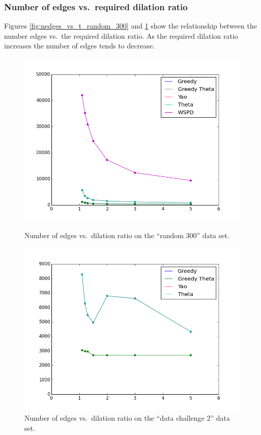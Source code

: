 \documentclass[a4paper,twoside,11pt,hidelinks]{article}
\theoremstyle{plain}
\theoremstyle{definition}  %
\begin{document}
\subsubsection{Number of edges vs.\ required dilation ratio}
\label{sec:edges_vs_dilation}

Figures \ref{fig:nedges_vs_t_random_300} and \ref{fig:nedges_vs_t_dc2} show the relationship between the number edges vs.\ the required dilation ratio. As the required dilation ratio increases the number of edges tends to decrease.

\begin{figure}[h]
    \begin{minipage}[t]{0.48\textwidth}
      \centering
      \includegraphics[width=\textwidth]{figures/nedges_vs_t_random_300}
      \caption{Number of edges vs.\ dilation ratio on the ``random 300'' data set.}
      \label{fig:nedges_vs_t_random_300}
    \end{minipage}
    \hfill
	\begin{minipage}[t]{0.48\textwidth}
      \centering
      \includegraphics[width=\textwidth]{figures/nedges_vs_t_dc2}
      \caption{Number of edges vs.\ dilation ratio on the ``data challenge 2'' data set.}
      \label{fig:nedges_vs_t_dc2}
    \end{minipage}
\end{figure}
\end{document}
